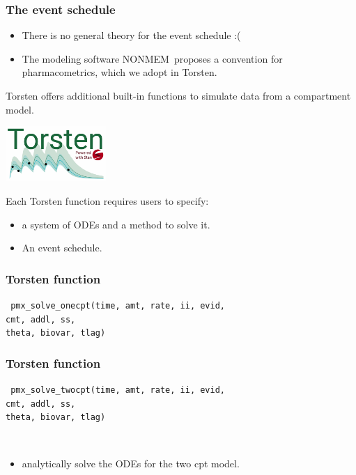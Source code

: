 \documentclass[xcolor=table]{beamer}
\begin{document}
\begin{frame}
  \frametitle{The event schedule}
  
  \begin{itemize}
    \item There is no general theory for the event schedule :(
    \item The modeling software NONMEM\textregistered \ proposes a convention for pharmacometrics,
    which we adopt in Torsten.
  \end{itemize}

\end{frame}

\begin{frame}
  
  Torsten offers additional built-in functions to simulate data from a compartment model.
  
  \begin{center}
    \includegraphics[width=1.5in]{../torstenLogo.png}
  \end{center}
  
  Each Torsten function requires users to specify:
  \begin{itemize}
    \item a system of ODEs and a method to solve it.
    \item An event schedule.
  \end{itemize}

\end{frame}

\begin{frame}
  \frametitle{Torsten function}
  
  \texttt{
    pmx\_solve\_onecpt(time, amt, rate, ii, evid, \\ 
    \hspace{3.3cm} cmt, addl, ss, \\
     \hspace{3.3cm} theta, biovar, tlag)
   }
  
\end{frame}

\begin{frame}
  \frametitle{Torsten function}
  
  \texttt{
    pmx\_solve\_\textcolor{MRGGreen}{twocpt}(time, amt, rate, ii, evid, \\ 
    \hspace{3.3cm} cmt, addl, ss, \\
     \hspace{3.3cm} theta, biovar, tlag)
   }
   
   \ \\
   \begin{itemize}
     \item analytically solve the ODEs for the two cpt model. 
   \end{itemize}
  
\end{frame}
\end{document}
